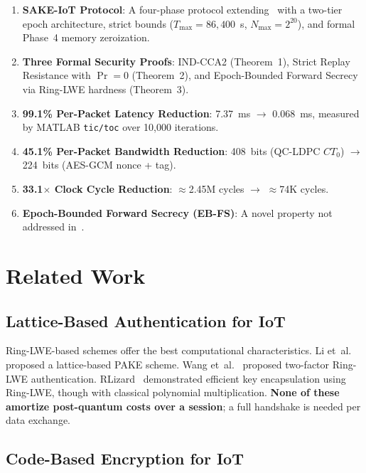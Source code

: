 \documentclass[runningheads]{llncs}
\newcommand{\Nmax}{N_{\max}}
\newcommand{\Tmax}{T_{\max}}
\begin{document}
\begin{enumerate}
  \item \textbf{SAKE-IoT Protocol}: A four-phase protocol extending~\cite{kumari2022}
        with a two-tier epoch architecture, strict bounds ($\Tmax=86{,}400$~s,
        $\Nmax=2^{20}$), and formal Phase~4 memory zeroization.
  \item \textbf{Three Formal Security Proofs}: IND-CCA2 (Theorem~1), Strict
        Replay Resistance with $\Pr = 0$ (Theorem~2), and Epoch-Bounded Forward
        Secrecy via Ring-LWE hardness (Theorem~3).
  \item \textbf{99.1\% Per-Packet Latency Reduction}: 7.37~ms $\to$ 0.068~ms,
        measured by MATLAB \texttt{tic/toc} over 10,000 iterations.
  \item \textbf{45.1\% Per-Packet Bandwidth Reduction}: 408~bits (QC-LDPC
        $CT_0$) $\to$ 224~bits (AES-GCM nonce + tag).
  \item \textbf{33.1$\times$ Clock Cycle Reduction}: $\approx$2.45M cycles
        $\to$ $\approx$74K cycles.
  \item \textbf{Epoch-Bounded Forward Secrecy (EB-FS)}: A novel property not
        addressed in~\cite{kumari2022}.
\end{enumerate}

\section{Related Work}
\label{sec:related}

\subsection{Lattice-Based Authentication for IoT}

Ring-LWE-based schemes offer the best computational characteristics. Li
et~al.~\cite{li2020} proposed a lattice-based PAKE scheme. Wang
et~al.~\cite{wang2019} proposed two-factor Ring-LWE authentication. RLizard~\cite{lee2019}
demonstrated efficient key encapsulation using Ring-LWE, though with classical
polynomial multiplication. \textbf{None of these amortize post-quantum costs
over a session}; a full handshake is needed per data exchange.

\subsection{Code-Based Encryption for IoT}
\end{document}
